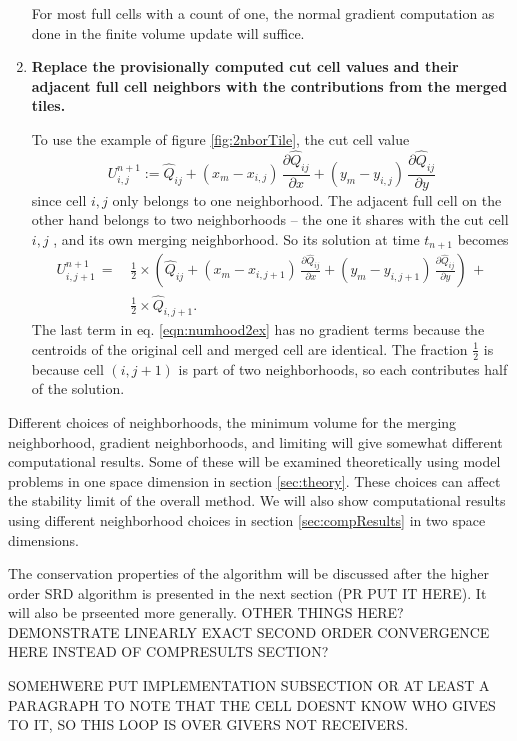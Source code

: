\begin{enumerate}
For most full cells with a count of one, the normal gradient
computation as done in the finite volume update will suffice.

\item
{\bf Replace the provisionally computed cut cell values and their adjacent
full cell neighbors with  the contributions from the merged tiles.} 

\vspace*{.1in}
To use the example of figure \ref{fig:2nborTile}, the cut cell value
\begin{equation}
   U_{i,j}^{n+1} := \widehat{Q}_{ij} 
   + (x_m - x_{i,j}) \, \frac{\partial \widehat{Q}_{ij}}{\partial x} 
   + (y_m - y_{i,j}) \, \frac{\partial \widehat{Q}_{ij}}{\partial y}
\end{equation}
since cell ${i,j}$ only belongs to one neighborhood. The adjacent full cell
on the other hand belongs to two neighborhoods -- the one it shares with
the cut cell $i,j$ , and its own merging neighborhood.
So its solution at time $t_{n+1}$  becomes
\begin{equation}
\label{eqn:numhood2ex}
\begin{split}
   U_{i,j+1}^{n+1} \,=\, & \frac{1}{2} \times \left
   (\widehat{Q}_{ij} 
   + (x_m - x_{i,j+1}) \, \frac{\partial \widehat{Q}_{ij}}{\partial x} 
   + (y_m - y_{i,j+1}) \, \frac{\partial \widehat{Q}_{ij}}{\partial y} \right ) \, + \\
    & \frac{1}{2} \times \widehat{Q}_{i,j+1} .
\end{split}
\end{equation}
The last term  in eq. \eqref{eqn:numhood2ex} has no gradient terms because the
centroids of the original cell and merged cell are identical.
The fraction $\frac{1}{2}$ is because cell $(i,j+1)$ is part of  two
neighborhoods, so each contributes half of the solution.

\end{enumerate}

Different choices of neighborhoods, the minimum volume for the merging
neighborhood, gradient neighborhoods, and limiting will give
somewhat different computational results. Some of these will be examined
theoretically using model problems in one space dimension in section
\ref{sec:theory}. These choices can affect the stability limit of the
overall method.
We will also show computational results using different neighborhood
choices in section \ref{sec:compResults} in two space dimensions.

The conservation properties of the algorithm will be discussed after the
higher order SRD algorithm is presented in the next
section (PR PUT IT HERE). It will also be prseented more generally.   
OTHER THINGS HERE? DEMONSTRATE LINEARLY EXACT SECOND ORDER CONVERGENCE
HERE INSTEAD OF COMPRESULTS SECTION?

SOMEHWERE PUT IMPLEMENTATION SUBSECTION OR AT LEAST A PARAGRAPH
TO NOTE THAT THE CELL DOESNT KNOW WHO GIVES TO
IT, SO THIS LOOP IS OVER GIVERS  NOT RECEIVERS.
